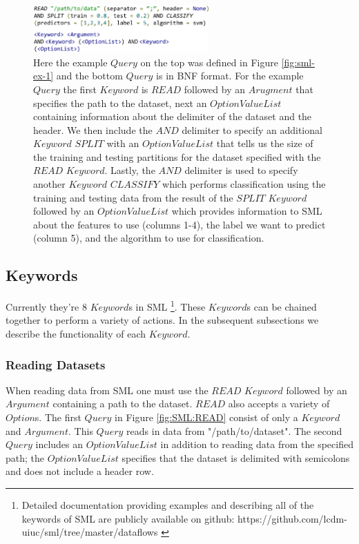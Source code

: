 \documentclass[jair,twoside,11pt,theapa]{article}
\begin{document}
\begin{figure}
\includegraphics[width=0.6\textwidth]{figs/bnf_ex.png}
\centering
\caption{Here the example \(Query\) on the top was defined in Figure \ref{fig:sml-ex-1} and the bottom \(Query\) is in BNF format. For the example \(Query\) the first \(Keyword\) is \(READ\) followed by an \(Arugment\) that specifies the path to the dataset, next an \(OptionValueList\) containing information about the delimiter of the dataset and the header. We then include the \(AND\) delimiter to specify an additional \(Keyword\) \(SPLIT\) with an \(OptionValueList\) that tells us the size of the training and testing partitions for the dataset specified with the \(READ\) \(Keyword\). Lastly, the \(AND\) delimiter is used to specify another \(Keyword\) \(CLASSIFY\) which performs classification using the training and testing data from the result of the  \(SPLIT\) \(Keyword\) followed by an \(OptionValueList\) which provides information  to SML about the features to use (columns 1-4), the label we want to predict (column 5), and the algorithm to use for classification.}
\label{fig:SML:BNFComp}
\end{figure}

\subsection{Keywords}
Currently they're 8 \(Keyword\)s in SML \footnote{Detailed documentation providing examples and describing all of the keywords of SML are publicly available on github: https://github.com/lcdm-uiuc/sml/tree/master/dataflows \label{SML:Dataflow}}. These \(Keyword\)s can be chained together to perform a variety of actions. In the subsequent subsections we describe the functionality of each \(Keyword\).

\subsubsection{Reading Datasets}
When reading data from SML one must use the \(READ\) \(Keyword\) followed by an \(Argument\) containing a path to the dataset. \(READ\) also accepts a variety of \(Option\)s. The first \(Query\) in Figure \ref{fig:SML:READ} consist of only a \(Keyword\) and \(Argument\). This \(Query\) reads in data from "/path/to/dataset". The second \(Query\) includes an \(OptionValueList\) in addition to reading data from the specified path; the \(OptionValueList\) specifies that the dataset is delimited with semicolons and does not include a header row. 
\end{document}

